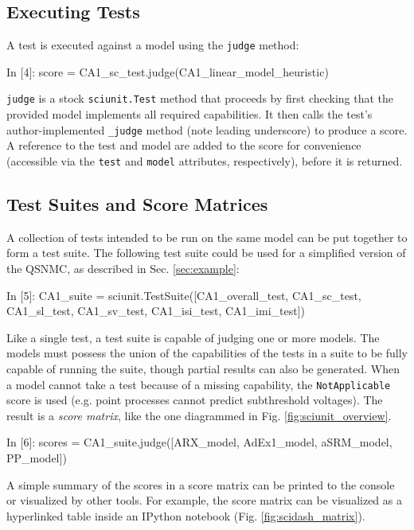 \documentclass{frontiersSCNS}
\let\verbx\lstinline
\begin{document}
\subsection{Executing Tests} A test is executed against a model using the \verbx{judge} method:
\begin{ipy}
  In [4]: score = CA1_sc_test.judge(CA1_linear_model_heuristic)
\end{ipy}

\verbx{judge} is a stock \verbx{sciunit.Test} method that proceeds by first checking that the provided model implements all required capabilities. 
It then calls the test's author-implemented \verbx{_judge} method (note leading underscore) to produce a score. 
A reference to the test and model are added to the score for convenience (accessible via the \verbx{test} and \verbx{model} attributes, respectively), before it is returned.

\subsection{Test Suites and Score Matrices}\label{sec:visualization} A collection of tests intended to be run on the same model can be put together to form a test suite.
The following test suite could be used for a simplified version of the QSNMC, as described in Sec. \ref{sec:example}:  
\begin{ipy}
  In [5]: CA1_suite = sciunit.TestSuite([CA1_overall_test, CA1_sc_test, CA1_sl_test, CA1_sv_test, 
              CA1_isi_test, CA1_imi_test])
\end{ipy}
Like a single test, a test suite is capable of judging one or more models. 
The models must possess the union of the capabilities of the tests in a suite to be fully capable of running the suite, though partial results can also be generated. 
When a model cannot take a test because of a missing capability, the \texttt{NotApplicable} score is used (e.g. point processes cannot predict subthreshold voltages). 
The result is a \emph{score matrix}, like the one diagrammed in Fig. \ref{fig:sciunit_overview}.
\begin{ipy}
  In [6]: scores = CA1_suite.judge([ARX_model, AdEx1_model, aSRM_model, PP_model])
\end{ipy}
A simple summary of the scores in a score matrix can be printed to the console or visualized by other tools.  
For example, the score matrix can be visualized as a hyperlinked table inside an IPython notebook \citep{perez_ipython_2007} (Fig. \ref{fig:scidash_matrix}).
\end{document}
